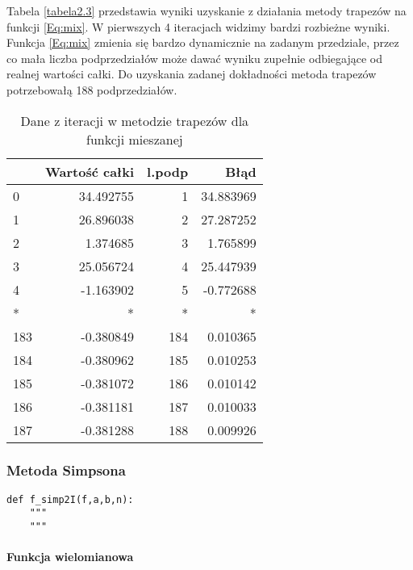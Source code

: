 \documentclass[12pt,twoside]{article}
\begin{document}
Tabela \eqref{tabela2.3} przedstawia wyniki uzyskanie z działania metody trapezów na funkcji \eqref{Eq:mix}. W pierwszych 4 iteracjach widzimy bardzi rozbieżne wyniki. Funkcja \eqref{Eq:mix} zmienia się bardzo dynamicznie na zadanym przedziale, przez co mała liczba podprzedziałów może dawać wyniku zupełnie odbiegające od realnej wartości całki. Do uzyskania zadanej dokładności metoda trapezów potrzebowałą 188 podprzedziałów.

\begin{table}[H]
\centering
\caption{Dane z iteracji w metodzie trapezów dla funkcji mieszanej}
\label{tabela2.3}
\begin{tabular}{lrrr}
\toprule
{} &  Wartość całki &  l.podp &       Błąd \\
\midrule
0   &      34.492755 &       1 &  34.883969 \\
1   &      26.896038 &       2 &  27.287252 \\
2   &       1.374685 &       3 &   1.765899 \\
3   &      25.056724 &       4 &  25.447939 \\
4   &      -1.163902 &       5 &  -0.772688 \\
*   &       * &       * &   * \\
183 &      -0.380849 &     184 &   0.010365 \\
184 &      -0.380962 &     185 &   0.010253 \\
185 &      -0.381072 &     186 &   0.010142 \\
186 &      -0.381181 &     187 &   0.010033 \\
187 &      -0.381288 &     188 &   0.009926 \\
\bottomrule
\end{tabular}

\end{table}

\subsubsection{Metoda Simpsona}

\begin{lstlisting}[caption={Kod w języku python implementujący metodę prostokątów}]
def f_simp2I(f,a,b,n):
    """
    """
\end{lstlisting}
\label{Listing 8}

\paragraph{Funkcja wielomianowa}\mbox{} \\
\end{document}
